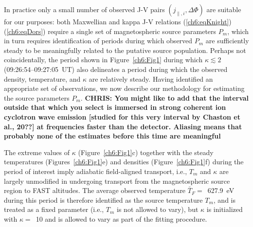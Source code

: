   In practice only a small number of observed J-V pairs
  $( j_{\parallel,i} , \Delta \Phi )$ are suitable for our purposes: both
  Maxwellian and kappa J-V relations (\ref{ch6:eqKnight}) (\ref{ch6:eqDors})
  require a single set of magnetospheric source parameters $P_m$, which in turn
  requires identification of periods during which observed $P_m$ are
  sufficiently steady to be meaningfully related to the putative source
  population. Perhaps not coincidentally, the period shown in
  Figure~\ref{ch6:Fig1} during which $\kappa \lesssim 2$ (09:26:54--09:27:05~UT)
  also delineates a period during which the observed density, temperature, and
  $\kappa$ are relatively steady. Having identified an appropriate set of
  observations, we now describe our methodology for estimating the source
  parameters $P_m$. \textbf{CHRIS: You might like to add that the interval
    outside that which you select is immersed in strong coherent ion cyclotron
    wave emission [studied for this very interval by Chaston et al., 20??] at
    frequencies faster than the detector. Aliasing means that probably none of
    the estimates before this time are meaningful}

  The extreme values of $\kappa$ (Figure~\ref{ch6:Fig1}c) together with the
  steady temperatures (Figures~\ref{ch6:Fig1}e) and densities
  (Figure~\ref{ch6:Fig1}f) during the period of interest imply adiabatic
  field-aligned transport, i.e., $T_m$ and $\kappa$ are largely unmodified in
  undergoing transport from the magnetospheric source region to FAST
  altitudes. The average observed temperature $\bar{T}_F =$~627.9~eV during this
  period is therefore identified as the source temperature $T_m$, and is treated
  as a fixed parameter (i.e., $T_m$ is not allowed to vary), but $\kappa$ is
  initialized with $\kappa =$~10 and is allowed to vary as part of the fitting
  procedure.
  
